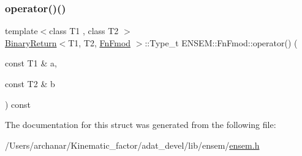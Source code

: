 \mbox{\label{structENSEM_1_1FnFmod_a3c0c1761f9aede2a2ec6382073727d3f}} 
\subsubsection{\texorpdfstring{operator()()}{operator()()}\hspace{0.1cm}{\footnotesize\ttfamily [2/2]}}
{\footnotesize\ttfamily template$<$class T1 , class T2 $>$ \\
\mbox{\hyperlink{structENSEM_1_1BinaryReturn}{Binary\+Return}}$<$T1, T2, \mbox{\hyperlink{structENSEM_1_1FnFmod}{Fn\+Fmod}} $>$\+::Type\+\_\+t E\+N\+S\+E\+M\+::\+Fn\+Fmod\+::operator() (\begin{DoxyParamCaption}\item[{const T1 \&}]{a,  }\item[{const T2 \&}]{b }\end{DoxyParamCaption}) const\hspace{0.3cm}{\ttfamily [inline]}}



The documentation for this struct was generated from the following file\+:\begin{DoxyCompactItemize}
\item 
/\+Users/archanar/\+Kinematic\+\_\+factor/adat\+\_\+devel/lib/ensem/\mbox{\hyperlink{lib_2ensem_2ensem_8h}{ensem.\+h}}\end{DoxyCompactItemize}
